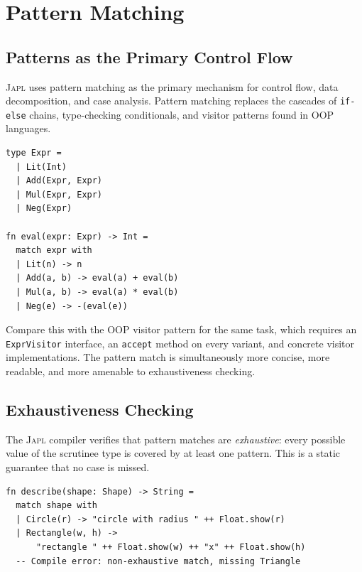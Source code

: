 \documentclass[11pt,a4paper]{article}
\newcommand{\japl}{\textsc{Japl}}
\begin{document}
\section{Pattern Matching}
\label{sec:pattern-matching}

\subsection{Patterns as the Primary Control Flow}

\japl{} uses pattern matching as the primary mechanism for control flow, data decomposition, and case analysis. Pattern matching replaces the cascades of \texttt{if-else} chains, type-checking conditionals, and visitor patterns found in OOP languages.

\begin{lstlisting}
type Expr =
  | Lit(Int)
  | Add(Expr, Expr)
  | Mul(Expr, Expr)
  | Neg(Expr)

fn eval(expr: Expr) -> Int =
  match expr with
  | Lit(n) -> n
  | Add(a, b) -> eval(a) + eval(b)
  | Mul(a, b) -> eval(a) * eval(b)
  | Neg(e) -> -(eval(e))
\end{lstlisting}

Compare this with the OOP visitor pattern for the same task, which requires an \texttt{ExprVisitor} interface, an \texttt{accept} method on every variant, and concrete visitor implementations. The pattern match is simultaneously more concise, more readable, and more amenable to exhaustiveness checking.

\subsection{Exhaustiveness Checking}

The \japl{} compiler verifies that pattern matches are \emph{exhaustive}: every possible value of the scrutinee type is covered by at least one pattern. This is a static guarantee that no case is missed.

\begin{lstlisting}
fn describe(shape: Shape) -> String =
  match shape with
  | Circle(r) -> "circle with radius " ++ Float.show(r)
  | Rectangle(w, h) ->
      "rectangle " ++ Float.show(w) ++ "x" ++ Float.show(h)
  -- Compile error: non-exhaustive match, missing Triangle
\end{lstlisting}
\end{document}
